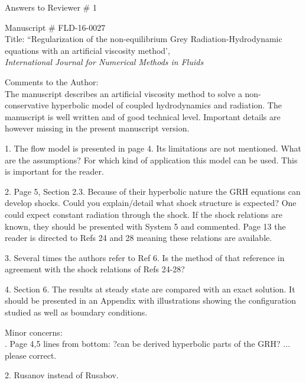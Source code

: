 \documentclass{article}
\begin{document}
\begin{center}
{ \Large Answers to Reviewer \# 1}
\end{center}

\bigskip

\noindent Manuscript \# FLD-16-0027 \\
Title: ``Regularization of the non-equilibrium Grey Radiation-Hydrodynamic equations with an artificial viscosity method', \\
{\it International Journal for Numerical Methods in Fluids}\\

\bigskip
\bigskip

{\color{blue}
Comments to the Author: \\ 
The manuscript describes an artificial viscosity method to solve a non-conservative hyperbolic model of coupled hydrodynamics and radiation. The manuscript is well written and of good technical level.
Important details are however missing in the present manuscript version.\\}

\bigskip

{\color{blue}
1. The flow model is presented in page 4. Its limitations are not mentioned. What are the assumptions? For which kind of application this model can be used. This is important for the reader. \\}

\bigskip

{\color{blue}
2. Page 5, Section 2.3. Because of their hyperbolic nature the GRH equations can develop shocks.
Could you explain/detail what shock structure is expected? One could expect constant radiation through the shock.
If the shock relations are known, they should be presented with System 5 and commented. Page 13 the reader is directed to Refs 24 and 28 meaning these relations are available.\\}

\bigskip

{\color{blue}
3. Several times the authors refer to Ref 6. Is the method of that reference in agreement with the shock relations of Refs 24-28?
\\}

\bigskip

{\color{blue}
4. Section 6. The results at steady state are compared with an exact solution. It should be presented in an Appendix with illustrations showing the configuration studied as well as boundary conditions. \\}

\bigskip

{\color{blue}
\noindent Minor concerns: \\
. Page 4,5 lines from bottom: ?can be derived hyperbolic parts of the GRH? ... please correct.\\}

\bigskip

{\color{blue}
 2. Rusanov instead of Rusabov.\\}
\end{document}
